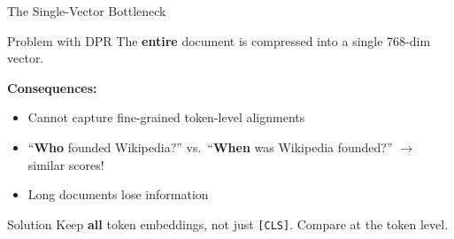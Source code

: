 \documentclass[aspectratio=169]{beamer}
\newif\ifanimated
\newcommand{\cpause}{\ifanimated\pause\fi}
\newcommand{\vd}{\mathbf{d}}
\begin{document}
\begin{frame}[shrink=10]{The Single-Vector Bottleneck}
\begin{alertblock}{Problem with DPR}
The \textbf{entire} document is compressed into a single 768-dim vector.
\end{alertblock}

\vspace{0.5em}

\begin{center}
\end{center}

\cpause
\vspace{0.2em}

\textbf{Consequences:}
\begin{itemize}
    \item Cannot capture fine-grained token-level alignments
    \item ``\textbf{Who} founded Wikipedia?'' vs.\ ``\textbf{When} was Wikipedia founded?'' $\to$ similar scores!
    \item Long documents lose information
\end{itemize}\cpause

\vspace{0.2em}

\begin{exampleblock}{Solution}
Keep \textbf{all} token embeddings, not just \texttt{[CLS]}. Compare at the token level.
\end{exampleblock}
\end{frame}
\end{document}
